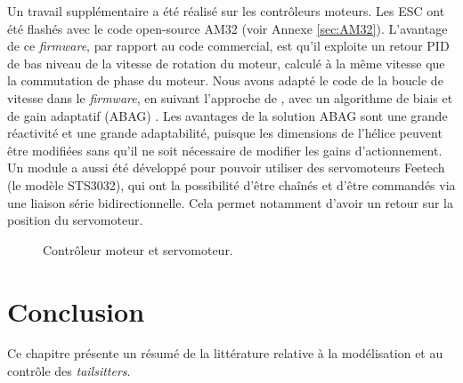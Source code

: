 Un travail supplémentaire a été réalisé sur les contrôleurs moteurs. Les ESC ont été flashés avec le code open-source AM32 (voir Annexe \ref{sec:AM32}). L'avantage de ce \textit{firmware}, par rapport au code commercial, est qu'il exploite un retour PID  de bas niveau de la vitesse de rotation du moteur, calculé à la même vitesse que la commutation de phase du moteur. Nous avons adapté le code de la boucle de vitesse dans le \textit{firmware}, en suivant l'approche de \cite{franchi2017}, avec un algorithme de biais et de gain adaptatif (ABAG) . Les avantages de la solution ABAG sont une grande réactivité et une grande adaptabilité, puisque les dimensions de l'hélice peuvent être modifiées sans qu'il ne soit nécessaire de modifier les gains d'actionnement.
Un module a aussi été développé pour pouvoir utiliser des servomoteurs Feetech (le modèle STS3032), qui ont la possibilité d'être chaînés et d'être commandés via une liaison série bidirectionnelle. Cela permet notamment d'avoir un retour sur la position du servomoteur.

\begin{figure}[ht!]
    \centering
    \caption{Contrôleur moteur et servomoteur.}
    \label{fig:ESCServo}
\end{figure}




\section{Conclusion}

Ce chapitre présente un résumé de la littérature relative à la modélisation et au contrôle des \textit{tailsitters}.

